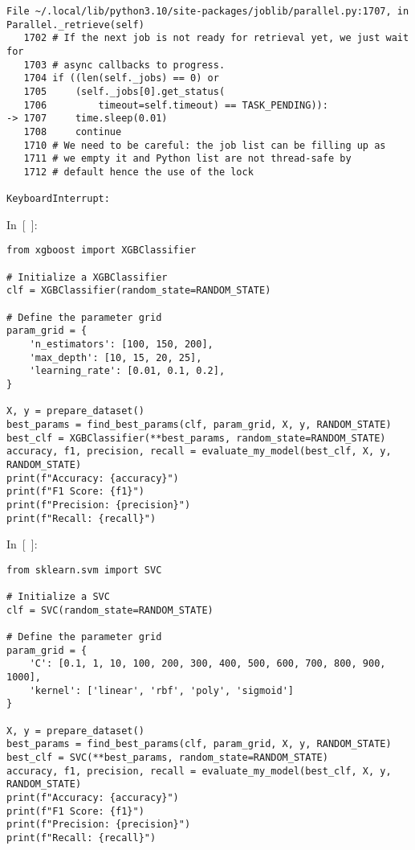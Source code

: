 \documentclass[
  english,
]{article}
\begin{document}
\begin{verbatim}
File ~/.local/lib/python3.10/site-packages/joblib/parallel.py:1707, in Parallel._retrieve(self)
   1702 # If the next job is not ready for retrieval yet, we just wait for
   1703 # async callbacks to progress.
   1704 if ((len(self._jobs) == 0) or
   1705     (self._jobs[0].get_status(
   1706         timeout=self.timeout) == TASK_PENDING)):
-> 1707     time.sleep(0.01)
   1708     continue
   1710 # We need to be careful: the job list can be filling up as
   1711 # we empty it and Python list are not thread-safe by
   1712 # default hence the use of the lock

KeyboardInterrupt: 
\end{verbatim}

In~{[}~{]}:

\begin{verbatim}
from xgboost import XGBClassifier

# Initialize a XGBClassifier
clf = XGBClassifier(random_state=RANDOM_STATE)

# Define the parameter grid
param_grid = {
    'n_estimators': [100, 150, 200],
    'max_depth': [10, 15, 20, 25],
    'learning_rate': [0.01, 0.1, 0.2],
}

X, y = prepare_dataset()
best_params = find_best_params(clf, param_grid, X, y, RANDOM_STATE)
best_clf = XGBClassifier(**best_params, random_state=RANDOM_STATE)
accuracy, f1, precision, recall = evaluate_my_model(best_clf, X, y, RANDOM_STATE)
print(f"Accuracy: {accuracy}")
print(f"F1 Score: {f1}")
print(f"Precision: {precision}")
print(f"Recall: {recall}")
\end{verbatim}

In~{[}~{]}:

\begin{verbatim}
from sklearn.svm import SVC

# Initialize a SVC
clf = SVC(random_state=RANDOM_STATE)

# Define the parameter grid
param_grid = {
    'C': [0.1, 1, 10, 100, 200, 300, 400, 500, 600, 700, 800, 900, 1000],
    'kernel': ['linear', 'rbf', 'poly', 'sigmoid']
}

X, y = prepare_dataset()
best_params = find_best_params(clf, param_grid, X, y, RANDOM_STATE)
best_clf = SVC(**best_params, random_state=RANDOM_STATE)
accuracy, f1, precision, recall = evaluate_my_model(best_clf, X, y, RANDOM_STATE)
print(f"Accuracy: {accuracy}")
print(f"F1 Score: {f1}")
print(f"Precision: {precision}")
print(f"Recall: {recall}")
\end{verbatim}
\end{document}
